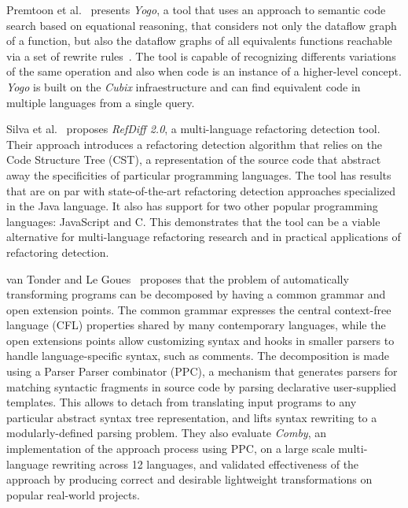 Premtoon et al.~\cite{premtoon2020-code-search-equational-reasoning} presents
\textit{Yogo}, a tool that uses an approach to semantic code search
based on equational reasoning, that considers not only the dataflow graph of
a function, but also the dataflow graphs of all equivalents functions reachable
via a set of rewrite rules~\cite{premtoon2020-code-search-equational-reasoning}.
The tool is capable of recognizing differents variations of the same operation
and also when code is an instance of a higher-level concept.
\textit{Yogo} is built on the \textit{Cubix} infraestructure and can find
equivalent code in multiple languages from a single query.

Silva et al.~\cite{silva2021-refdiff} proposes \textit{RefDiff 2.0}, a
multi-language refactoring detection tool. Their approach introduces a
refactoring detection algorithm that relies on the Code Structure Tree
(CST), a representation of the source code that abstract away the
specificities of particular programming languages.
The tool has results that are on par with state-of-the-art refactoring
detection approaches specialized in the Java language. It also has support
for two other popular programming languages: JavaScript and C. This
demonstrates that the tool can be a viable alternative for multi-language
refactoring research and in practical applications of refactoring detection.

van Tonder and Le Goues~\cite{vanTonder2019-syntax-transformation-ppc} proposes
that the problem of automatically transforming programs can be decomposed by
having a common grammar and open extension points. The common grammar expresses
the central context-free language (CFL) properties shared by many contemporary
languages, while the open extensions points allow customizing syntax and hooks
in smaller parsers to handle language-specific syntax, such as comments.
The decomposition is made using a Parser Parser combinator (PPC), a mechanism
that generates parsers for matching syntactic fragments in source code by parsing
declarative user-supplied templates.
This allows to detach from translating input programs to any particular
abstract syntax tree representation, and lifts syntax rewriting to a
modularly-defined parsing problem.
They also evaluate \textit{Comby}, an implementation of the approach process
using PPC, on a large scale multi-language rewriting across 12 languages, and
validated effectiveness of the approach by producing correct and desirable
lightweight transformations on popular real-world projects.

